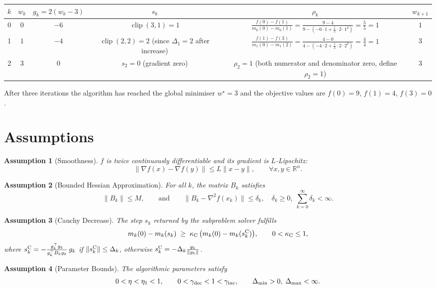\documentclass{article}
\newtheorem{assumption}{Assumption}
\newcommand{\R}{\mathbb{R}}
\begin{document}
\begin{center}
\begin{tabular}{c|c|c|c|c|c}
$k$ & $w_{k}$ & $g_{k}=2(w_{k}-3)$ & $s_{k}$ & $\rho_{k}$ & $w_{k+1}$ \\
\hline
0 & $0$ & $-6$ & $ \operatorname{clip}(3,1)=1$ & 
\(\displaystyle\frac{f(0)-f(1)}{m_{0}(0)-m_{0}(1)}=
\frac{9-4}{9- ( -6\cdot1+\tfrac12\cdot2\cdot1^{2})}= \frac{5}{5}=1\) &
$1$ \\
1 & $1$ & $-4$ & $\operatorname{clip}(2,2)=2$ (since $\Delta_{1}=2$ after increase) &
\(\displaystyle\frac{f(1)-f(3)}{m_{1}(0)-m_{1}(2)}=
\frac{4-0}{4- ( -4\cdot2+\tfrac12\cdot2\cdot2^{2})}= \frac{4}{4}=1\) &
$3$ \\
2 & $3$ & $0$ & $s_{2}=0$ (gradient zero) &
$\rho_{2}=1$ (both numerator and denominator zero, define $\rho_{2}=1$) &
$3$ \\
\end{tabular}
\end{center}
After three iterations the algorithm has reached the global minimiser $w^{\star}=3$ and the objective values are $f(0)=9$, $f(1)=4$, $f(3)=0$.

\section*{Assumptions}
\begin{assumption}[Smoothness]\label{ass:smooth}
$f$ is twice continuously differentiable and its gradient is $L$‑Lipschitz:
\[
\|\nabla f(x)-\nabla f(y)\|\le L\|x-y\|,\qquad\forall x,y\in\R^{n}.
\]
\end{assumption}
\begin{assumption}[Bounded Hessian Approximation]\label{ass:hessian}
For all $k$, the matrix $B_{k}$ satisfies
\[
\|B_{k}\|\le M,\qquad\text{and}\qquad 
\|B_{k}-\nabla^{2}f(x_{k})\|\le \delta_{k},\quad\delta_{k}\ge0,\;
\sum_{k=0}^{\infty}\delta_{k}<\infty .
\]
\end{assumption}
\begin{assumption}[Cauchy Decrease]\label{ass:cauchy}
The step $s_{k}$ returned by the subproblem solver fulfills
\[
m_{k}(0)-m_{k}(s_{k})\;\ge\;\kappa_{\rm C}\,
\bigl(m_{k}(0)-m_{k}(s_{k}^{\rm C})\bigr),\qquad 0<\kappa_{\rm C}\le1,
\]
where $s_{k}^{\rm C}= -\frac{g_{k}^{\top}g_{k}}{g_{k}^{\top}B_{k}g_{k}}\,g_{k}$ if $\|s_{k}^{\rm C}\|\le\Delta_{k}$, otherwise $s_{k}^{\rm C}=-\Delta_{k}\frac{g_{k}}{\|g_{k}\|}$.
\end{assumption}
\begin{assumption}[Parameter Bounds]\label{ass:param}
The algorithmic parameters satisfy
\[
0<\eta<\eta_{1}<1,\qquad
0<\gamma_{\rm dec}<1<\gamma_{\rm inc},\qquad
\Delta_{\min}>0,\;\Delta_{\max}<\infty .
\]
\end{assumption}
\end{document}
